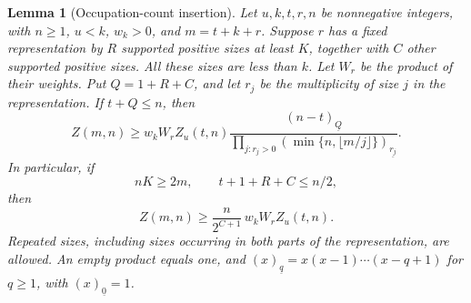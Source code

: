 \documentclass[11pt]{amsart}
\newtheorem{lemma}[theorem]{Lemma}
\theoremstyle{remark}\newtheorem{remark}[theorem]{Remark}
\newcommand{\fall}[2]{(#1)_{\underline{#2}}}
\begin{document}
\begin{lemma}[Occupation-count insertion]\label{lem:insertion}
Let $u,k,t,r,n$ be nonnegative integers, with $n\ge1$, $u<k$, $w_k>0$,
and $m=t+k+r$. Suppose $r$ has a fixed representation
by $R$ supported positive sizes at least $K$, together with $C$ other
supported positive sizes. All these sizes are less than $k$. Let $W_r$ be
the product of their weights. Put $Q=1+R+C$, and let $r_j$ be the
multiplicity of size $j$ in the representation. If $t+Q\le n$, then
\begin{equation}\label{eq:sharpinsertion}
 Z(m,n)\ge w_kW_r Z_u(t,n)
 \frac{\fall{n-t}{Q}}
 {\displaystyle\prod_{j:r_j>0}\fall{\min\{n,\lfloor m/j\rfloor\}}{r_j}}.
\end{equation}
In particular, if
\begin{equation}\label{eq:insertionconditions}
 nK\ge2m,\qquad t+1+R+C\le n/2,
\end{equation}
then
\begin{equation}\label{eq:insertion}
 Z(m,n)\ge\frac{n}{2^{C+1}}\,w_k W_r Z_u(t,n).
\end{equation}
Repeated sizes, including sizes occurring in both parts of the
representation, are allowed. An empty product equals one, and
$(x)_{\underline q}=x(x-1)\cdots(x-q+1)$ for $q\ge1$, with
$(x)_{\underline0}=1$.
\end{lemma}
\end{document}
